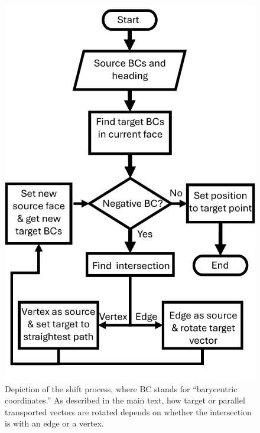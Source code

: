 \documentclass[preprint,12pt]{elsarticle}
\begin{document}
\begin{figure}[t]
    \centering
    \includegraphics[width=1.0\columnwidth]{shift_flowchart_v4.pdf}
    \caption{Depiction of the shift process, where BC stands for ``barycentric coordinates.'' As described in the main text, how target or parallel transported vectors are rotated depends on whether the intersection is with an edge or a vertex.}
    \label{fig:shift_flowchart}
\end{figure}
\end{document}
